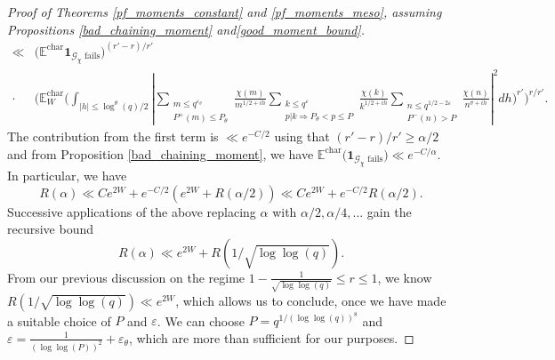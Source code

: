\documentclass[reqno]{amsart}
\theoremstyle{definition}
\theoremstyle{remark}
\numberwithin{equation}{section}
\theoremstyle{remark}
\begin{document}
\begin{proof}[Proof of Theorems \ref{pf_moments_constant} and \ref{pf_moments_meso}, assuming Propositions \ref{bad_chaining_moment} and\ref{good_moment_bound}]
\begin{align*}
        \ll& \big(\mathbb{E}^{\text{char}}\mathbf{1}_{\mathcal{G}_\chi \text{ fails}}\big)^{(r'-r)/r'} \\
        \cdot& \big(\mathbb{E}_W^{\text{char}}\big(\int_{|h|\leq \log^\theta(q)/2}|\sum_{\substack{m \leq q^{\varepsilon_\theta} \\ P^+(m) \leq P_\theta}}\frac{\chi(m)}{m^{1/2+ih}}\sum_{\substack{k \leq q^{\varepsilon} \\ p|k \Rightarrow P_\theta < p \leq P}}\frac{\chi(k)}{k^{1/2+ih}}\sum_{\substack{n \leq q^{1/2-2\varepsilon} \\ P^{-}(n) > P}}\frac{\chi(n)}{n^{\sigma+ih}}|^2dh\big)^{r'}\big)^{r/r'}.
    \end{align*}
    The contribution from the first term is $\ll e^{-C/2}$ using that $(r'-r)/r' \geq \alpha/2$ and from Proposition \ref{bad_chaining_moment}, we have $\mathbb{E}^{\text{char}}\big(\mathbf{1}_{\mathcal{G}_\chi \text{ fails}}\big) \ll e^{-C/\alpha}$. In particular, we have
    $$R(\alpha) \ll Ce^{2W} + e^{-C/2}(e^{2W}+R(\alpha/2)) \ll Ce^{2W} + e^{-C/2}R(\alpha/2).$$
    Successive applications of the above replacing $\alpha$ with $\alpha/2, \alpha/4,...$ gain the recursive bound
    $$R(\alpha) \ll e^{2W}+R(1/\sqrt{\log\log(q)}).$$
    From our previous discussion on the regime $1-\frac{1}{\sqrt{\log\log(q)}} \leq r \leq 1$, we know $R(1/\sqrt{\log\log(q)}) \ll e^{2W}$, which allows us to conclude, once we have made a suitable choice of $P$ and $\varepsilon$. We can choose $P=q^{1/(\log\log(q))^8}$ and $\varepsilon = \frac{1}{(\log\log(P))^2}+\varepsilon_\theta$, which are more than sufficient for our purposes.
\end{proof}
\end{document}
